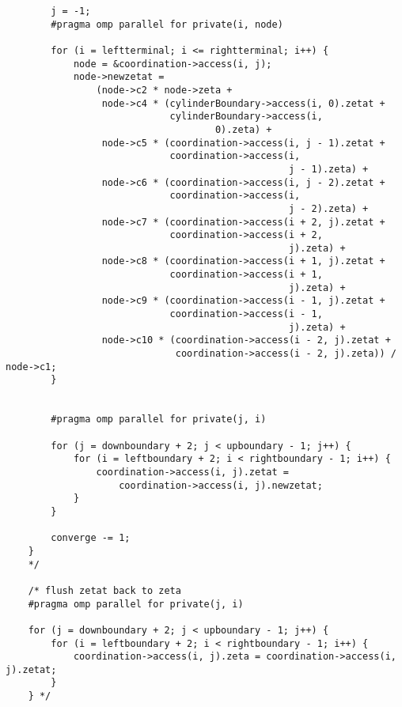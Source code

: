 \documentclass[12pt]{article}
\begin{document}
\begin{itemize}
\begin{lstlisting}
        j = -1;
        #pragma omp parallel for private(i, node)

        for (i = leftterminal; i <= rightterminal; i++) {
            node = &coordination->access(i, j);
            node->newzetat =
                (node->c2 * node->zeta +
                 node->c4 * (cylinderBoundary->access(i, 0).zetat +
                             cylinderBoundary->access(i,
                                     0).zeta) +
                 node->c5 * (coordination->access(i, j - 1).zetat +
                             coordination->access(i,
                                                  j - 1).zeta) +
                 node->c6 * (coordination->access(i, j - 2).zetat +
                             coordination->access(i,
                                                  j - 2).zeta) +
                 node->c7 * (coordination->access(i + 2, j).zetat +
                             coordination->access(i + 2,
                                                  j).zeta) +
                 node->c8 * (coordination->access(i + 1, j).zetat +
                             coordination->access(i + 1,
                                                  j).zeta) +
                 node->c9 * (coordination->access(i - 1, j).zetat +
                             coordination->access(i - 1,
                                                  j).zeta) +
                 node->c10 * (coordination->access(i - 2, j).zetat +
                              coordination->access(i - 2, j).zeta)) / node->c1;
        }


        #pragma omp parallel for private(j, i)

        for (j = downboundary + 2; j < upboundary - 1; j++) {
            for (i = leftboundary + 2; i < rightboundary - 1; i++) {
                coordination->access(i, j).zetat =
                    coordination->access(i, j).newzetat;
            }
        }

        converge -= 1;
    }
    */

    /* flush zetat back to zeta 
    #pragma omp parallel for private(j, i)

    for (j = downboundary + 2; j < upboundary - 1; j++) {
        for (i = leftboundary + 2; i < rightboundary - 1; i++) {
            coordination->access(i, j).zeta = coordination->access(i, j).zetat;
        }
    } */
\end{lstlisting}

\end{itemize}
\end{document}
